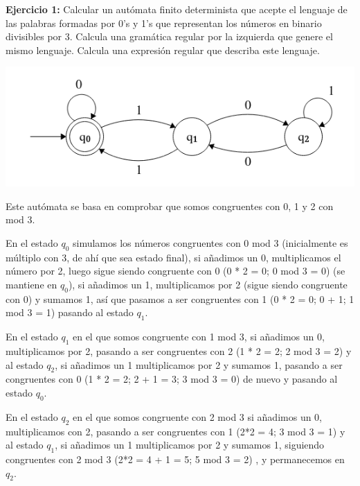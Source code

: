 \documentclass[12pt, spanish]{article}
\begin{document}



\textbf{Ejercicio 1:} Calcular  un  autómata  finito  determinista  que  acepte  el  lenguaje  de  las  palabras  formadas por 0's y 1's que representan los números en binario divisibles por 3. Calcula una gramática regular  por  la  izquierda  que  genere  el  mismo  lenguaje.  Calcula  una  expresión  regular  que describa este lenguaje.

\begin{center}
	\includegraphics[scale=0.7]{aut1.png}
\end{center}

Este autómata se basa en comprobar que somos congruentes con 0, 1 y 2 con mod 3. 

En el estado $q_0$ simulamos los números congruentes con 0 mod 3 (inicialmente es múltiplo con 3, de ahí que sea estado final), si añadimos un 0, multiplicamos el número por 2, luego sigue siendo congruente con 0 (0 * 2 = 0; 0 mod 3 = 0) (se mantiene en $q_0$), si añadimos un 1, multiplicamos por 2 (sigue siendo congruente con 0) y sumamos 1, así que pasamos a ser congruentes con 1 (0 * 2 = 0; 0 + 1;  1 mod 3 = 1) pasando al estado $q_1$.

En el estado $q_1$ en el que somos congruente con 1 mod 3, si añadimos un 0, multiplicamos por 2, pasando a ser congruentes con 2 (1 * 2 = 2; 2 mod 3 = 2) y al estado $q_2$, si añadimos un 1 multiplicamos por 2 y sumamos 1, pasando a ser congruentes con 0 (1 * 2 = 2; 2 + 1 = 3; 3 mod 3 = 0) de nuevo y pasando al estado $q_0$.


En el estado $q_2$ en el que somos congruente con 2 mod 3 si añadimos un 0, multiplicamos con 2, pasando a ser congruentes con 1 (2*2 = 4; 3 mod 3 = 1) y al estado $q_1$, si añadimos un 1 multiplicamos por 2 y sumamos 1, siguiendo congruentes con 2 mod 3 (2*2 = 4 + 1 = 5; 5 mod 3 = 2) , y permanecemos en $q_2$.
\end{document}
